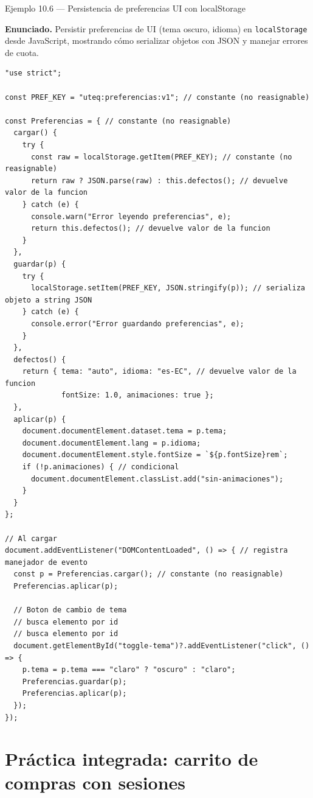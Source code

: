 \begin{cajaejemplo}{Ejemplo 10.6 --- Persistencia de preferencias UI con localStorage}

\textbf{Enunciado.} Persistir preferencias de UI (tema oscuro, idioma) en \texttt{localStorage} desde JavaScript, mostrando cómo serializar objetos con JSON y manejar errores de cuota.

\begin{lstlisting}[style=js,caption={preferencias.js},label=lst:10.14]
"use strict";

const PREF_KEY = "uteq:preferencias:v1"; // constante (no reasignable)

const Preferencias = { // constante (no reasignable)
  cargar() {
    try {
      const raw = localStorage.getItem(PREF_KEY); // constante (no reasignable)
      return raw ? JSON.parse(raw) : this.defectos(); // devuelve valor de la funcion
    } catch (e) {
      console.warn("Error leyendo preferencias", e);
      return this.defectos(); // devuelve valor de la funcion
    }
  },
  guardar(p) {
    try {
      localStorage.setItem(PREF_KEY, JSON.stringify(p)); // serializa objeto a string JSON
    } catch (e) {
      console.error("Error guardando preferencias", e);
    }
  },
  defectos() {
    return { tema: "auto", idioma: "es-EC", // devuelve valor de la funcion
             fontSize: 1.0, animaciones: true };
  },
  aplicar(p) {
    document.documentElement.dataset.tema = p.tema;
    document.documentElement.lang = p.idioma;
    document.documentElement.style.fontSize = `${p.fontSize}rem`;
    if (!p.animaciones) { // condicional
      document.documentElement.classList.add("sin-animaciones");
    }
  }
};

// Al cargar
document.addEventListener("DOMContentLoaded", () => { // registra manejador de evento
  const p = Preferencias.cargar(); // constante (no reasignable)
  Preferencias.aplicar(p);

  // Boton de cambio de tema
  // busca elemento por id
  // busca elemento por id
  document.getElementById("toggle-tema")?.addEventListener("click", () => {
    p.tema = p.tema === "claro" ? "oscuro" : "claro";
    Preferencias.guardar(p);
    Preferencias.aplicar(p);
  });
});
\end{lstlisting}
\end{cajaejemplo}

\section{Práctica integrada: carrito de compras con sesiones}

